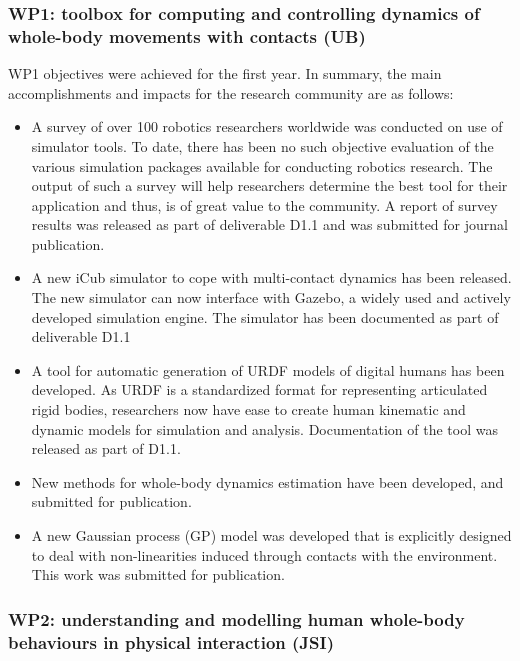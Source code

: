 \documentclass[12pt,a4paper,twoside]{article}
\begin{document}
\subsubsection{WP1: toolbox for computing and controlling dynamics of whole-body movements with contacts (UB)}

WP1 objectives were achieved for the first year. In summary, the main accomplishments and impacts for the research community are as follows: 

\begin{itemize}

\item A survey of over 100 robotics researchers worldwide was conducted on use of simulator tools.  To date, there has been no such objective evaluation of the various simulation packages available for conducting robotics research. The output of such a survey will help researchers determine the best tool for their application and thus, is of great value to the community.  A report of survey results was released as part of deliverable D1.1 and was submitted for journal publication. 

\item A new iCub simulator to cope with multi-contact dynamics has been released. The new simulator can now interface with Gazebo, a widely used and actively developed simulation engine. The simulator has been documented as part of deliverable D1.1

\item A tool for automatic generation of URDF models of digital humans has been developed. As URDF is a standardized format for representing articulated rigid bodies, researchers  now have ease to create human kinematic and dynamic models for simulation and analysis. Documentation of the tool was released as part of D1.1. 

\item New methods for whole-body dynamics estimation have been developed, and submitted for publication. 

\item A new Gaussian process (GP) model was developed that is explicitly designed to deal with non-linearities induced through contacts with the environment. This work was submitted for publication. 
 
 \end{itemize}
 
\subsubsection{WP2: understanding and modelling human whole-body behaviours in physical interaction (JSI)}
\end{document}

